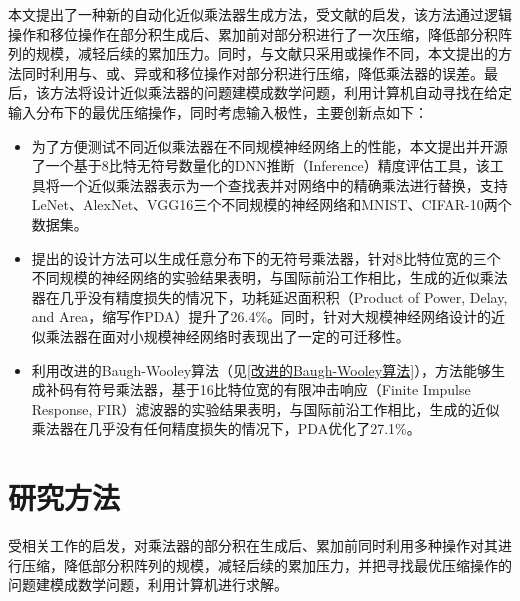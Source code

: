 本文提出了一种新的自动化近似乘法器生成方法，受文献\cite{AC:AM:SDLC}的启发，该方法通过逻辑操作和移位操作在部分积生成后、累加前对部分积进行了一次压缩，降低部分积阵列的规模，减轻后续的累加压力。同时，与文献\cite{AC:AM:SDLC}只采用或操作不同，本文提出的方法同时利用与、或、异或和移位操作对部分积进行压缩，降低乘法器的误差。最后，该方法将设计近似乘法器的问题建模成数学问题，利用计算机自动寻找在给定输入分布下的最优压缩操作，同时考虑输入极性，主要创新点如下：
\begin{itemize}
    \item 为了方便测试不同近似乘法器在不同规模神经网络上的性能，本文提出并开源了一个基于8比特无符号数量化的DNN推断（Inference）精度评估工具，该工具将一个近似乘法器表示为一个查找表并对网络中的精确乘法进行替换，支持LeNet\cite{DNN:LeNet_MNIST}、AlexNet\cite{DNN:AlexNet}、VGG16\cite{DNN:VGG16}三个不同规模的神经网络和MNIST\cite{DNN:LeNet_MNIST}、CIFAR-10\cite{DNN:CIFAR-10}两个数据集。
    \item 提出的设计方法可以生成任意分布下的无符号乘法器，针对8比特位宽的三个不同规模的神经网络的实验结果表明，与国际前沿工作相比，生成的近似乘法器在几乎没有精度损失的情况下，功耗延迟面积积（Product of Power, Delay, and Area，缩写作PDA）提升了26.4\%。同时，针对大规模神经网络设计的近似乘法器在面对小规模神经网络时表现出了一定的可迁移性。
    \item 利用改进的Baugh-Wooley算法\cite{EM:baugh-wooley,EM:baugh-wooley_modified_PP_reorga,EM:baugh-wooley_diff}（见\ref{改进的Baugh-Wooley算法}），方法能够生成补码有符号乘法器，基于16比特位宽的有限冲击响应（Finite Impulse Response, FIR）滤波器的实验结果表明，与国际前沿工作相比，生成的近似乘法器在几乎没有任何精度损失的情况下，PDA优化了27.1\%。
\end{itemize}

\section{研究方法}

受相关工作\cite{AC:AM:SDLC,AC:AM:OU,AC:AM:CGP_2016}的启发，对乘法器的部分积在生成后、累加前同时利用多种操作对其进行压缩，降低部分积阵列的规模，减轻后续的累加压力，并把寻找最优压缩操作的问题建模成数学问题，利用计算机进行求解。

